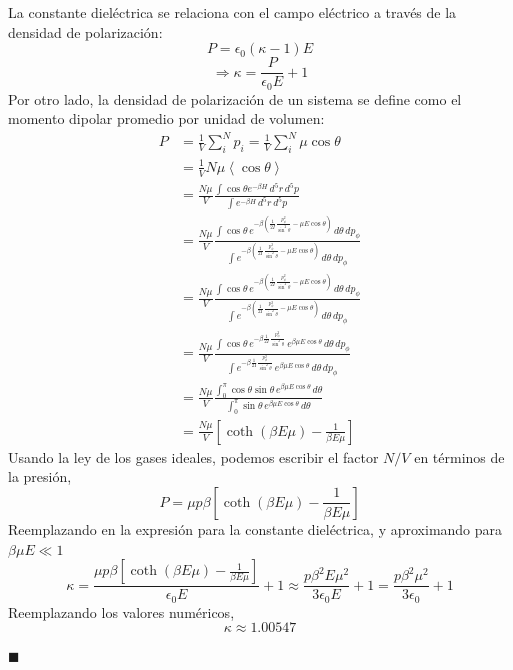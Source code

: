 \documentclass[]{article}
\numberwithin{equation}{section}
\newcommand{\0}{\textcolor{gray}{0}}
\newcommand{\eo}{\epsilon_{0}}
\newcommand{\pr}[1]{\left\langle #1 \right\rangle }
\newcommand{\qed}{\hfill\(\blacksquare\)}
\begin{document}
\begin{enumerate}
	La constante dieléctrica se relaciona con el campo eléctrico a través de la densidad de polarización:
	\begin{equation*}
		P = \eo (\kappa - 1) E
	\end{equation*}
	\begin{equation}
		\Rightarrow \kappa = \frac{P}{\eo E} + 1
	\end{equation}
	Por otro lado, la densidad de polarización de un sistema se define como el momento dipolar promedio por unidad de volumen:
	\begin{align}
		P &= \frac{1}{V}\sum_{i}^{N} p_i = \frac{1}{V}\sum_{i}^{N} \mu\cos\theta \nonumber\\
		&= \frac{1}{V} N \mu \pr{\cos\theta} \nonumber\\
		&= \frac{N \mu}{V} \frac{\int \cos\theta e^{-\beta H} \, d^5r \, d^5p}{\int e^{-\beta H} \, d^5r \, d^5p} \nonumber\\
		&= \frac{N \mu}{V} \frac{\int \cos\theta \, e^{-\beta \left(\frac{1}{2 I} \frac{p_\phi^2}{\sin^2\theta} - \mu E \cos\theta \right)} \, d\theta \, dp_\phi}{\int e^{-\beta \left(\frac{1}{2 I}\frac{p_\phi^2}{\sin^2\theta} - \mu E \cos\theta \right)} \, d\theta \, dp_\phi} \nonumber\\
		&= \frac{N \mu}{V} \frac{\int \cos\theta \, e^{-\beta \left(\frac{1}{2 I} \frac{p_\phi^2}{\sin^2\theta} - \mu E \cos\theta \right)} \, d\theta \, dp_\phi}{\int e^{-\beta \left(\frac{1}{2 I}\frac{p_\phi^2}{\sin^2\theta} - \mu E \cos\theta \right)} \, d\theta \, dp_\phi} \nonumber\\
		&= \frac{N \mu}{V} \frac{\int \cos\theta \, e^{-\beta \frac{1}{2 I} \frac{p_\phi^2}{\sin^2\theta}} \, e^{ \beta \mu E \cos\theta } \, d\theta \, dp_\phi}{\int e^{-\beta \frac{1}{2 I} \frac{p_\phi^2}{\sin^2\theta}} \, e^{ \beta \mu E \cos\theta } \, d\theta \, dp_\phi} \nonumber\\
		&= \frac{N \mu}{V} \frac{\int_{0}^{\pi} \cos\theta \sin\theta \, e^{ \beta \mu E \cos\theta } \, d\theta }{\int_{0}^{\pi} \sin\theta \, e^{ \beta \mu E \cos\theta } \, d\theta} \nonumber\\
		&= \frac{N \mu}{V} \left[\coth(\beta E \mu) - \frac{1}{\beta E \mu }\right]
	\end{align}
	Usando la ley de los gases ideales, podemos escribir el factor $N/V$ en términos de la presión,
	\begin{equation}
		P = \mu p\beta \left[\coth(\beta E \mu) - \frac{1}{\beta E \mu }\right]
	\end{equation}
	Reemplazando en la expresión para la constante dieléctrica, y aproximando para $\beta\mu E \ll 1$
	\begin{equation}
		\kappa = \frac{\mu p\beta \left[\coth(\beta E \mu) - \frac{1}{\beta E \mu }\right]}{\eo E} + 1 \approx \frac{p\beta^2 E \mu^2}{3 \eo E} + 1 =  \frac{p\beta^2 \mu^2}{3 \eo} + 1
	\end{equation}
	Reemplazando los valores numéricos,
	\begin{equation}
		\kappa \approx 1.00547
	\end{equation}
	
	\qed
\end{enumerate}
\end{document}
